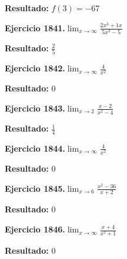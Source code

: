 \documentclass[10pt,a4paper]{article}
\begin{document}
\begin{solbox}
\textbf{Resultado:} \(\displaystyle f(3) = -67\)
\end{solbox}

\begin{ejbox}
\textbf{Ejercicio 1841.}\quad $\lim_{x\to \infty} \frac{2x^3 + 1x}{5x^3 - 5}$
\end{ejbox}

\begin{solbox}
\textbf{Resultado:} \(\displaystyle \frac{2}{5}\)
\end{solbox}

\begin{ejbox}
\textbf{Ejercicio 1842.}\quad $\lim_{x\to \infty} \frac{4}{x^2}$
\end{ejbox}

\begin{solbox}
\textbf{Resultado:} \(\displaystyle 0\)
\end{solbox}

\newpage
\begin{ejbox}
\textbf{Ejercicio 1843.}\quad $\lim_{x\to 2} \frac{x-2}{x^2-4}$
\end{ejbox}

\begin{solbox}
\textbf{Resultado:} \(\displaystyle \frac{1}{4}\)
\end{solbox}

\begin{ejbox}
\textbf{Ejercicio 1844.}\quad $\lim_{x\to \infty} \frac{4}{x^2}$
\end{ejbox}

\begin{solbox}
\textbf{Resultado:} \(\displaystyle 0\)
\end{solbox}

\begin{ejbox}
\textbf{Ejercicio 1845.}\quad $\lim_{x\to 6} \frac{x^2-36}{x+2}$
\end{ejbox}

\begin{solbox}
\textbf{Resultado:} \(\displaystyle 0\)
\end{solbox}

\newpage
\begin{ejbox}
\textbf{Ejercicio 1846.}\quad $\lim_{x\to \infty} \frac{x + 4}{x^2 + 1}$
\end{ejbox}

\begin{solbox}
\textbf{Resultado:} \(\displaystyle 0\)
\end{solbox}
\end{document}
